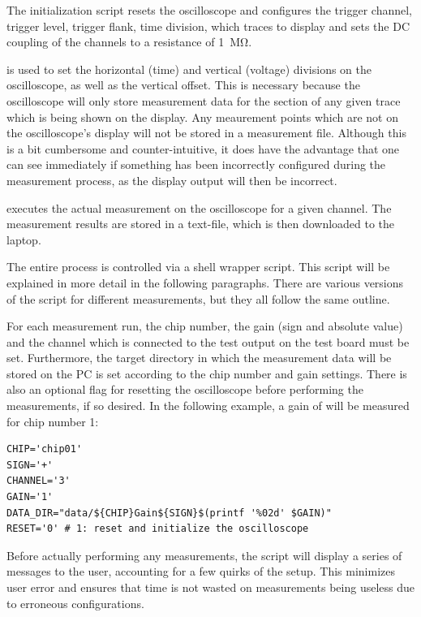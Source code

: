 The initialization script  resets the oscilloscope and  configures the trigger
channel, trigger level, trigger flank,  time division, which traces to display
and sets the DC coupling of the channels to a resistance of \SI{1}{\mega\ohm}.

 is used  to set the horizontal  (time) and vertical
(voltage) divisions on the oscilloscope,  as well as the vertical offset. This
is necessary because the oscilloscope will only store measurement data for the
section of any given trace which is being shown on the display. Any meaurement
points which  are not on  the oscilloscope's display will  not be stored  in a
measurement file. Although this is a  bit cumbersome and counter-intuitive, it
does have  the advantage that  one can see  immediately if something  has been
incorrectly configured during  the measurement process, as  the display output
will then be incorrect.

  executes   the  actual  measurement   on  the
oscilloscope  for a  given channel. The  measurement results  are stored  in a
text-file, which is then downloaded to the laptop.

The entire process is controlled via  a shell wrapper script. This script will
be explained  in more  detail in the  following paragraphs. There  are various
versions of  the script for  different measurements,  but they all  follow the
same outline.

For each measurement run, the chip  number, the gain (sign and absolute value)
and the channel which  is connected to the test output on  the test board must
be set.  Furthermore, the target directory  in which the measurement data will
be stored  on the PC is  set according to  the chip number and  gain settings.
There  is  also  an  optional  flag  for  resetting  the  oscilloscope  before
performing the measurements,  if so desired. In the following  example, a gain
of  will be measured for chip number 1:

\begin{verbatim}
CHIP='chip01'
SIGN='+'
CHANNEL='3'
GAIN='1'
DATA_DIR="data/${CHIP}Gain${SIGN}$(printf '%02d' $GAIN)"
RESET='0' # 1: reset and initialize the oscilloscope
\end{verbatim}

Before actually performing any measurements,  the script will display a series
of  messages to  the user,  accounting  for a  few quirks  of the  setup. This
minimizes user error and ensures that time is not wasted on measurements being
useless due to erroneous configurations.

